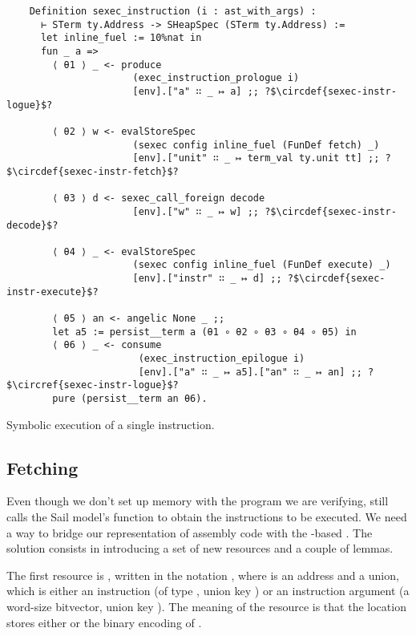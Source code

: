\begin{listing}[htb]
  \startcstep
  \begin{verbatim}
    Definition sexec_instruction (i : ast_with_args) :
      ⊢ STerm ty.Address -> SHeapSpec (STerm ty.Address) :=
      let inline_fuel := 10%nat in
      fun _ a =>
        ⟨ θ1 ⟩ _ <- produce
                      (exec_instruction_prologue i)
                      [env].["a" ∷ _ ↦ a] ;; ?$\circdef{sexec-instr-logue}$?

        ⟨ θ2 ⟩ w <- evalStoreSpec
                      (sexec config inline_fuel (FunDef fetch) _)
                      [env].["unit" ∷ _ ↦ term_val ty.unit tt] ;; ?$\circdef{sexec-instr-fetch}$?

        ⟨ θ3 ⟩ d <- sexec_call_foreign decode
                      [env].["w" ∷ _ ↦ w] ;; ?$\circdef{sexec-instr-decode}$?

        ⟨ θ4 ⟩ _ <- evalStoreSpec
                      (sexec config inline_fuel (FunDef execute) _)
                      [env].["instr" ∷ _ ↦ d] ;; ?$\circdef{sexec-instr-execute}$?

        ⟨ θ5 ⟩ an <- angelic None _ ;;
        let a5 := persist__term a (θ1 ∘ θ2 ∘ θ3 ∘ θ4 ∘ θ5) in
        ⟨ θ6 ⟩ _ <- consume
                       (exec_instruction_epilogue i)
                       [env].["a" ∷ _ ↦ a5].["an" ∷ _ ↦ an] ;; ?$\circref{sexec-instr-logue}$?
        pure (persist__term an θ6).
  \end{verbatim}
  \caption{Symbolic execution of a single instruction.}
  \label{lst:sexec-instr}
\end{listing}

\subsection{Fetching}

Even though we don't set up memory with the program we are verifying,  still calls the Sail model's  function to obtain the instructions to be executed. We need a way to bridge our  representation of assembly code with the -based . The solution consists in introducing a set of new resources and a couple of lemmas.

The first resource is , written in the notation , where  is an address and  a union, which is either an instruction  (of type , union key ) or an instruction argument  (a word-size bitvector, union key ). The meaning of the resource is that the location  stores either  or the binary encoding of .

